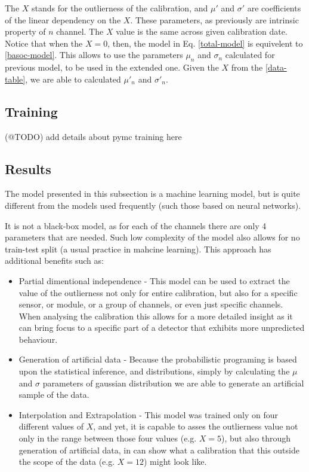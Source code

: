 The $X$ stands for the outlierness of the calibration, and $\mu\prime$ and $\sigma\prime$ are coefficients of the linear dependency on the $X$.
These parameters, as previously are intrinsic property of $n$ channel.
The $X$ value is the same across given calibration date.
Notice that when the $X=0$, then, the model in Eq. \ref{total-model} is equivelent to \ref{basoc-model}.
This allows to use the parameters $\mu_{n}$ and $\sigma_{n}$ calculated for previous model, to be used in the extended one.
Given the $X$ from the \ref{data-table}, we are able to calculated $\mu\prime_{n}$ and $\sigma\prime_{n}$.

\subsection{Training}
(@TODO) add details about pymc training here

\subsection{Results}

The model presented in this subsection is a machine learning model, but is quite different from the models used frequently (such those based on neural networks).

It is not a black-box model, as for each of the channels there are only 4 parameters that are needed. Such low complexity of the model also allows for no train-test split (a usual practice in mahcine learning).
This approach has additional benefits such as:

\begin{itemize}
  \item Partial dimentional independence - This model can be used to extract the value of the outlierness not only for entire calibration, but also for a specific sensor, or module, or a group of channels, or even just specific channels. When analysing the calibration this allows for a more detailed insight as it can bring focus to a specific part of a detector that exhibits more unpredicted behaviour.
  \item Generation of artificial data - Because the probabilistic programing is based upon the statistical inference, and distributions, simply by calculating the $\mu$ and $\sigma$ parameters of gaussian distribution we are able to generate an artificial sample of the data.
  \item Interpolation and Extrapolation - This model was trained only on four different values of $X$, and yet, it is capable to asses the outlierness value not only in the range between those four values (e.g. $X=5$), but also through generation of artificial data, in can show what a calibration that this outside the scope of the data (e.g. $X=12$) might look like.
\end{itemize}

